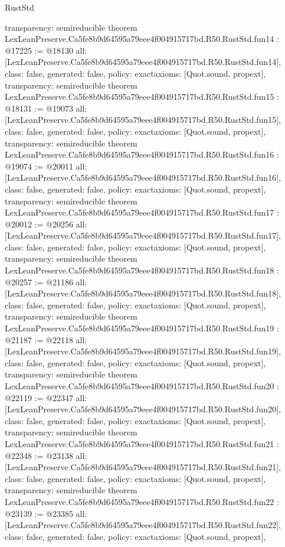 \begin{lexlean}{RustStd}
\begin{coremodule}
{  transparency: semireducible
}
theorem LexLeanPreserve.Ca5fe8b9d64595a79eee4f004915717bd.R50.RustStd.fun14 : @17225 := @18130 {
  all: [LexLeanPreserve.Ca5fe8b9d64595a79eee4f004915717bd.R50.RustStd.fun14],
  class: false,
  generated: false,
  policy: exact{axioms: [Quot.sound, propext]},
  transparency: semireducible
}
theorem LexLeanPreserve.Ca5fe8b9d64595a79eee4f004915717bd.R50.RustStd.fun15 : @18131 := @19073 {
  all: [LexLeanPreserve.Ca5fe8b9d64595a79eee4f004915717bd.R50.RustStd.fun15],
  class: false,
  generated: false,
  policy: exact{axioms: [Quot.sound, propext]},
  transparency: semireducible
}
theorem LexLeanPreserve.Ca5fe8b9d64595a79eee4f004915717bd.R50.RustStd.fun16 : @19074 := @20011 {
  all: [LexLeanPreserve.Ca5fe8b9d64595a79eee4f004915717bd.R50.RustStd.fun16],
  class: false,
  generated: false,
  policy: exact{axioms: [Quot.sound, propext]},
  transparency: semireducible
}
theorem LexLeanPreserve.Ca5fe8b9d64595a79eee4f004915717bd.R50.RustStd.fun17 : @20012 := @20256 {
  all: [LexLeanPreserve.Ca5fe8b9d64595a79eee4f004915717bd.R50.RustStd.fun17],
  class: false,
  generated: false,
  policy: exact{axioms: [Quot.sound, propext]},
  transparency: semireducible
}
theorem LexLeanPreserve.Ca5fe8b9d64595a79eee4f004915717bd.R50.RustStd.fun18 : @20257 := @21186 {
  all: [LexLeanPreserve.Ca5fe8b9d64595a79eee4f004915717bd.R50.RustStd.fun18],
  class: false,
  generated: false,
  policy: exact{axioms: [Quot.sound, propext]},
  transparency: semireducible
}
theorem LexLeanPreserve.Ca5fe8b9d64595a79eee4f004915717bd.R50.RustStd.fun19 : @21187 := @22118 {
  all: [LexLeanPreserve.Ca5fe8b9d64595a79eee4f004915717bd.R50.RustStd.fun19],
  class: false,
  generated: false,
  policy: exact{axioms: [Quot.sound, propext]},
  transparency: semireducible
}
theorem LexLeanPreserve.Ca5fe8b9d64595a79eee4f004915717bd.R50.RustStd.fun20 : @22119 := @22347 {
  all: [LexLeanPreserve.Ca5fe8b9d64595a79eee4f004915717bd.R50.RustStd.fun20],
  class: false,
  generated: false,
  policy: exact{axioms: [Quot.sound, propext]},
  transparency: semireducible
}
theorem LexLeanPreserve.Ca5fe8b9d64595a79eee4f004915717bd.R50.RustStd.fun21 : @22348 := @23138 {
  all: [LexLeanPreserve.Ca5fe8b9d64595a79eee4f004915717bd.R50.RustStd.fun21],
  class: false,
  generated: false,
  policy: exact{axioms: [Quot.sound, propext]},
  transparency: semireducible
}
theorem LexLeanPreserve.Ca5fe8b9d64595a79eee4f004915717bd.R50.RustStd.fun22 : @23139 := @23385 {
  all: [LexLeanPreserve.Ca5fe8b9d64595a79eee4f004915717bd.R50.RustStd.fun22],
  class: false,
  generated: false,
  policy: exact{axioms: [Quot.sound, propext]},
}
\end{coremodule}
\end{lexlean}
